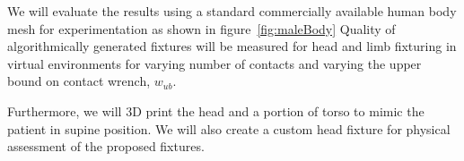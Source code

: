 We will evaluate the results using a standard commercially available human body 
mesh for experimentation as shown in figure~\ref{fig:maleBody} Quality 
of algorithmically generated fixtures will be measured for head and limb 
fixturing in virtual environments for varying number of contacts and varying the upper bound on contact wrench, $w_{ub}$.

Furthermore, we will 3D print the head and a portion of torso to mimic the patient in supine position. We will also create a custom head fixture for physical assessment of the proposed fixtures. 